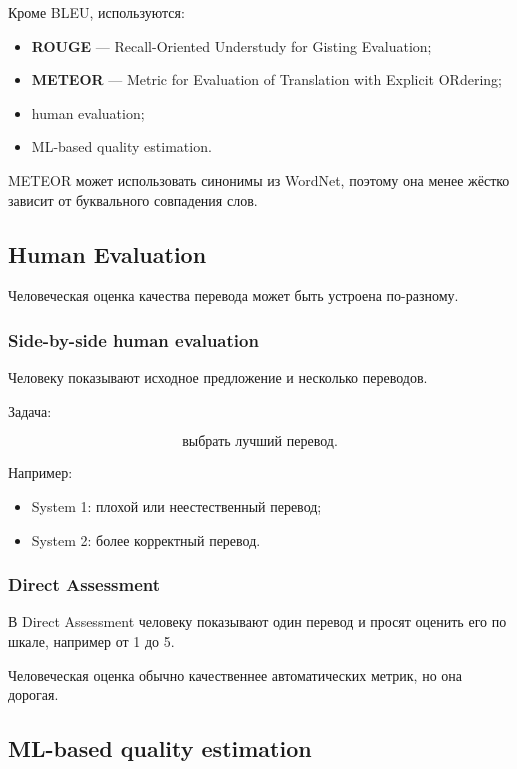 \documentclass[a4paper,12pt]{article}
\begin{document}
Кроме BLEU, используются:

\begin{itemize}
    \item \textbf{ROUGE} --- Recall-Oriented Understudy for Gisting Evaluation;
    \item \textbf{METEOR} --- Metric for Evaluation of Translation with Explicit ORdering;
    \item human evaluation;
    \item ML-based quality estimation.
\end{itemize}

METEOR может использовать синонимы из WordNet, поэтому она менее жёстко зависит от буквального совпадения слов.

\subsection{Human Evaluation}

Человеческая оценка качества перевода может быть устроена по-разному.

\subsubsection{Side-by-side human evaluation}

Человеку показывают исходное предложение и несколько переводов.

Задача:

\[
\text{выбрать лучший перевод}.
\]

Например:

\begin{itemize}
    \item System 1: плохой или неестественный перевод;
    \item System 2: более корректный перевод.
\end{itemize}

\subsubsection{Direct Assessment}

В Direct Assessment человеку показывают один перевод и просят оценить его по шкале, например от 1 до 5.

Человеческая оценка обычно качественнее автоматических метрик, но она дорогая.

\subsection{ML-based quality estimation}
\end{document}
